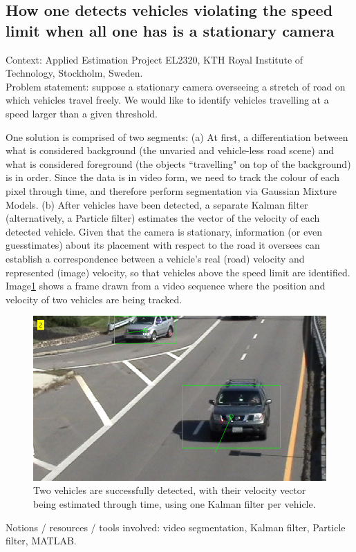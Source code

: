 \subsection{How one detects vehicles violating the speed limit when
all one has is a stationary camera}

Context: Applied Estimation Project EL2320, KTH Royal Institute of Technology,
Stockholm, Sweden.\\

Problem statement: suppose a stationary camera overseeing a stretch of road on
which vehicles travel freely. We would like to identify vehicles travelling at
a speed larger than a given threshold.

One solution is comprised of two segments: (a) At first, a differentiation
between what is considered background (the unvaried and vehicle-less road scene)
and what is considered foreground (the objects ``travelling" on top of the
background) is in order. Since the data is in video form, we need to track
the colour of each pixel through time, and therefore perform segmentation via
Gaussian Mixture Models. (b) After vehicles have been detected, a separate
Kalman filter (alternatively, a Particle filter) estimates the vector of the
velocity of each detected vehicle. Given that the camera is stationary,
information (or even guesstimates) about its placement with respect to the
road it oversees can establish a correspondence between a vehicle's real (road)
velocity and represented (image) velocity, so that vehicles above the speed
limit are identified. Image\ref{fig:kf_1} shows a frame drawn from a video
sequence where the position and velocity of two vehicles are being tracked.

\begin{figure}[H]\centering
  \includegraphics[scale=0.55]{images/kf_1.png}
  \caption{Two vehicles are successfully detected, with their velocity vector
    being estimated through time, using one Kalman filter per vehicle.}
  \label{fig:kf_1}
\end{figure}

Notions / resources / tools involved: video segmentation, Kalman filter,
Particle filter, MATLAB.
